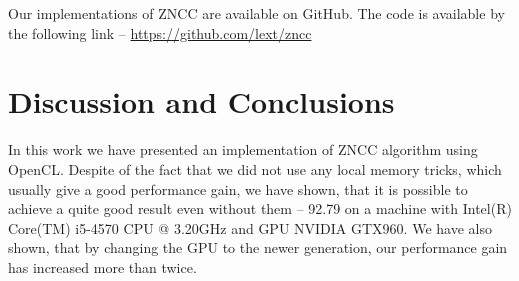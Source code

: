 \documentclass[conference]{IEEEtran}
\begin{document}
Our implementations of ZNCC are available on GitHub. The code is available by the following link -- \url{https://github.com/lext/zncc}

\section{Discussion and Conclusions}
In this work we have presented an implementation of ZNCC algorithm using OpenCL. Despite of the fact that we did not use any local memory tricks, which usually give a good performance gain, we have shown, that it is possible to  achieve a quite good result even without them -- 92.79 on a machine with Intel(R) Core(TM) i5-4570 CPU @ 3.20GHz and GPU NVIDIA GTX960. We have also shown, that by changing the GPU to the newer generation, our performance gain has increased more than twice.



\end{document}
